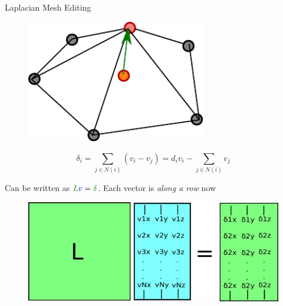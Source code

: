 \documentclass{beamer}
\begin{document}
\begin{frame}{Laplacian Mesh Editing}

\begin{minipage}{0.45\textwidth}{
\begin{figure}[t]
    \includegraphics[width=0.7\textwidth]{2DDiscreteCurvature.pdf}
\end{figure}
}
\end{minipage}
\begin{minipage}{0.45\textwidth}
\[ \delta_i = \sum_{j \in N(i)} (v_i - v_j) = d_i v_i - \sum_{j \in N(i)} v_j\]
\end{minipage}


Can be written as $\textcolor{darkgreen}{L} \textcolor{blue}{v} = \textcolor{darkgreen}{\delta}$.  Each vector is {\em along a row} now

\begin{figure}[t]
    \includegraphics[width=\textwidth]{LaplacianReconstruction.pdf}
\end{figure}


\end{frame}
\end{document}
